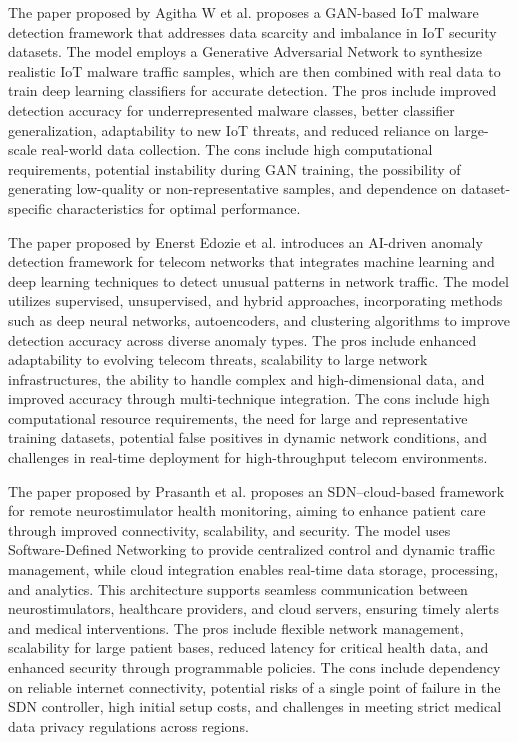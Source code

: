 \documentclass[a4paper,fleqn]{cas-dc}
\numberwithin{equation}{section}
\begin{document}
The paper proposed by Agitha W et al.\cite{W2025} proposes a GAN-based IoT malware detection framework that addresses data scarcity and imbalance in IoT security datasets. The model employs a Generative Adversarial Network to synthesize realistic IoT malware traffic samples, which are then combined with real data to train deep learning classifiers for accurate detection. The pros include improved detection accuracy for underrepresented malware classes, better classifier generalization, adaptability to new IoT threats, and reduced reliance on large-scale real-world data collection. The cons include high computational requirements, potential instability during GAN training, the possibility of generating low-quality or non-representative samples, and dependence on dataset-specific characteristics for optimal performance.

The paper proposed by Enerst Edozie et al.\cite{Edozie2025} introduces an AI-driven anomaly detection framework for telecom networks that integrates machine learning and deep learning techniques to detect unusual patterns in network traffic. The model utilizes supervised, unsupervised, and hybrid approaches, incorporating methods such as deep neural networks, autoencoders, and clustering algorithms to improve detection accuracy across diverse anomaly types. The pros include enhanced adaptability to evolving telecom threats, scalability to large network infrastructures, the ability to handle complex and high-dimensional data, and improved accuracy through multi-technique integration. The cons include high computational resource requirements, the need for large and representative training datasets, potential false positives in dynamic network conditions, and challenges in real-time deployment for high-throughput telecom environments.

The paper proposed by Prasanth et al.\cite{Prasanth2025} proposes an SDN–cloud-based framework for remote neurostimulator health monitoring, aiming to enhance patient care through improved connectivity, scalability, and security. The model uses Software-Defined Networking to provide centralized control and dynamic traffic management, while cloud integration enables real-time data storage, processing, and analytics. This architecture supports seamless communication between neurostimulators, healthcare providers, and cloud servers, ensuring timely alerts and medical interventions. The pros include flexible network management, scalability for large patient bases, reduced latency for critical health data, and enhanced security through programmable policies. The cons include dependency on reliable internet connectivity, potential risks of a single point of failure in the SDN controller, high initial setup costs, and challenges in meeting strict medical data privacy regulations across regions.
\end{document}
